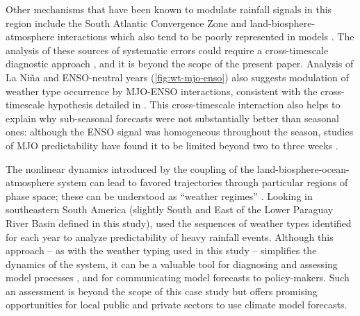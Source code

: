 \documentclass{ametsoc}
\begin{document}
Other mechanisms that have been known to modulate rainfall signals in this region include the South Atlantic Convergence Zone \citep{Carvalho2004,Munoz2015,Munoz2016} and land-biosphere-atmosphere interactions \citep{Grimm:2000bt,Grimm:2009bq} which also tend to be poorly represented in models \citep{Green:2017cs,Koster:2004ge}.
The analysis of these sources of systematic errors could require a cross-timescale diagnostic approach \citep{Munoz:2017ct}, and it is beyond the scope of the present paper.
Analysis of La Ni\~na and ENSO-neutral years (\cref{fig:wt-mjo-enso}) also suggests modulation of weather type occurrence by MJO-ENSO interactions, consistent with the cross-timescale hypothesis detailed in \citet{Munoz2015}.
This cross-timescale interaction also helps to explain why sub-seasonal forecasts were not substantially better than seasonal ones: although the ENSO signal was homogeneous throughout the season, studies of MJO predictability have found it to be limited beyond two to three weeks \citep{Ding:2010em,Vitart:2014bt,Kim:2014bt}.

The nonlinear dynamics introduced by the coupling of the land-biosphere-ocean-atmosphere system can lead to favored trajectories through particular regions of phase space; these can be understood as ``weather regimes'' \citep[see][for a comprehensive discussion]{Hannachi2017}.
Looking in southeastern South America (slightly South and East of the Lower Paraguay River Basin defined in this study), \citet{Munoz2016} used the sequences of weather types identified for each year to analyze predictability of heavy rainfall events.
Although this approach -- as with the weather typing used in this study -- simplifies the dynamics of the system, it can be a valuable tool for diagnosing and assessing model processes \citep{Munoz:2017ct}, and for communicating model forecasts to policy-makers.
Such an assessment is beyond the scope of this case study but offers promising opportunities for local public and private sectors to use climate model forecasts.
\end{document}
